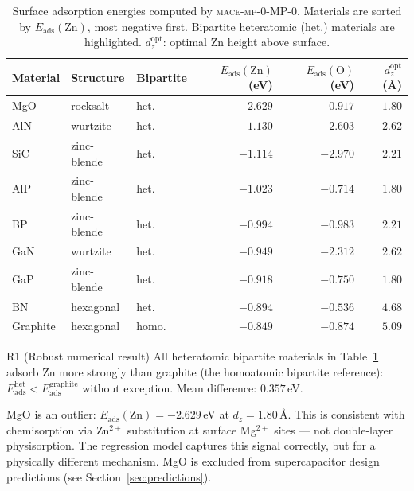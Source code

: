 \documentclass[11pt,a4paper]{article}
\newcommand{\Eads}{E_{\mathrm{ads}}}
\newcommand{\MACE}{\textsc{mace-mp-0}}
\begin{document}
\begin{table}[ht]
\centering
\caption{Surface adsorption energies computed by \MACE-MP-0. Materials are sorted by $\Eads(\mathrm{Zn})$, most negative first. Bipartite heteratomic (het.) materials are highlighted. $d_z^{\mathrm{opt}}$: optimal Zn height above surface.}
\label{tab:adsorption}
\begin{tabular}{lllrrr}
\toprule
Material & Structure & Bipartite & $\Eads(\mathrm{Zn})$ (eV) & $\Eads(\mathrm{O})$ (eV) & $d_z^{\mathrm{opt}}$ (\AA) \\
\midrule
MgO      & rocksalt   & het.\ & $-2.629$ & $-0.917$ & $1.80$ \\
AlN      & wurtzite   & het.\ & $-1.130$ & $-2.603$ & $2.62$ \\
SiC      & zinc-blende & het.\ & $-1.114$ & $-2.970$ & $2.21$ \\
AlP      & zinc-blende & het.\ & $-1.023$ & $-0.714$ & $1.80$ \\
BP       & zinc-blende & het.\ & $-0.994$ & $-0.983$ & $2.21$ \\
GaN      & wurtzite   & het.\ & $-0.949$ & $-2.312$ & $2.62$ \\
GaP      & zinc-blende & het.\ & $-0.918$ & $-0.750$ & $1.80$ \\
BN       & hexagonal  & het.\ & $-0.894$ & $-0.536$ & $4.68$ \\
Graphite & hexagonal  & homo. & $-0.849$ & $-0.874$ & $5.09$ \\
\bottomrule
\end{tabular}
\end{table}

\begin{proposition}{R1 (Robust numerical result)}
All heteratomic bipartite materials in Table~\ref{tab:adsorption} adsorb Zn more strongly than graphite (the homoatomic bipartite reference): $\Eads^{\text{het}} < \Eads^{\text{graphite}}$ without exception. Mean difference: $0.357$\,eV.
\end{proposition}

\begin{remark}
MgO is an outlier: $\Eads(\mathrm{Zn}) = -2.629$\,eV at $d_z = 1.80$\,\AA. This is consistent with chemisorption via Zn$^{2+}$ substitution at surface Mg$^{2+}$ sites — not double-layer physisorption. The regression model captures this signal correctly, but for a physically different mechanism. MgO is excluded from supercapacitor design predictions (see Section~\ref{sec:predictions}).
\end{remark}
\end{document}
